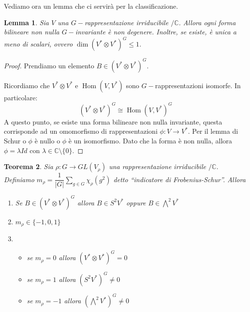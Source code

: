 \documentclass[11pt]{article}
\theoremstyle{plain}
\newtheorem{thm}{Teorema}[section]
\newtheorem{lemma}[thm]{Lemma}
\theoremstyle{definition}
\theoremstyle{remark}
\newcommand{\C}{\mathbb{C}}
\newcommand{\dsum}{\displaystyle\sum}
\DeclareMathOperator{\Hom}{Hom}
\begin{document}
Vediamo ora un lemma che ci servirà per la classificazione.
\begin{lemma}
Sia $V$ una $G-$rappresentazione irriducibile $/\C$. Allora ogni forma bilineare non nulla $G-$invariante è non degenere. Inoltre, se esiste, è unica a meno di scalari, ovvero $\dim (V^*\otimes V^*)^G\le1$.
\end{lemma}
\begin{proof}
Prendiamo un elemento $B \in \left( V^* \otimes V^*\right) ^G$.

Ricordiamo che $V^* \otimes V^*$ e $\Hom(V, V^*)$ sono $G-$rappresentazioni isomorfe. In particolare:
\[\left(V^* \otimes V^*\right)^G \cong \Hom(V, V^*)^G \]
A questo punto, se esiste una forma bilineare non nulla invariante, questa corrisponde ad un omomorfismo di rappresentazioni $\phi: V\to V^*$.
Per il lemma di Schur o $\phi$ è nullo o $\phi$ è un isomorfismo. Dato che la forma è non nulla, allora $\phi = \lambda Id$ con $\lambda \in \C\setminus\{0\}$.
\end{proof}


\begin{thm}
Sia $\rho:G\to GL(V_\rho)$ una rappresentazione irriducibile $/\C$.\\
Definiamo $m_\rho = \dfrac{1}{|G|} \dsum_{g \in G} \chi_{\rho}(g^2)$ detto ``indicatore di Frobenius-Schur''. Allora
\begin{enumerate}
\item Se $B \in (V^* \otimes V^*)^G$ allora $B \in S^2V^*$ oppure $B \in \bigwedge ^2 V^*$
\item  $m_\rho \in \{-1, 0, 1 \}$
\item{ \begin{itemize}
   \item se $m_\rho = 0$ allora $(V^*\otimes V^*)^G = 0$
   \item se $m_\rho = 1$ allora $(S^2 V^*)^G \neq 0$
   \item se $m_\rho = -1$ allora $(\bigwedge^2 V^*)^G \neq 0$
\end{itemize}
}
\end{enumerate}
\end{thm}
\end{document}
